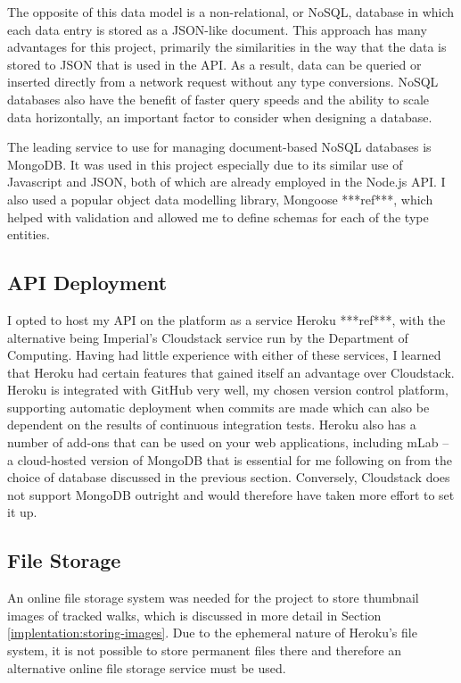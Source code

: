 The opposite of this data model is a non-relational, or NoSQL, database in which each data entry is stored as a JSON-like document. This approach has many advantages for this project, primarily the similarities in the way that the data is stored to JSON that is used in the API. As a result, data can be queried or inserted directly from a network request without any type conversions. NoSQL databases also have the benefit of faster query speeds and the ability to scale data horizontally, an important factor to consider when designing a database.

The leading service to use for managing document-based NoSQL databases is MongoDB. It was used in this project especially due to its similar use of Javascript and JSON, both of which are already employed in the Node.js API. I also used a popular object data modelling library, Mongoose ***ref***, which helped with validation and allowed me to define schemas for each of the type entities.

\subsection{API Deployment}

I opted to host my API on the platform as a service Heroku ***ref***, with the alternative being Imperial's Cloudstack service run by the Department of Computing. Having had little experience with either of these services, I learned that Heroku had certain features that gained itself an advantage over Cloudstack. Heroku is integrated with GitHub very well, my chosen version control platform, supporting automatic deployment when commits are made which can also be dependent on the results of continuous integration tests. Heroku also has a number of add-ons that can be used on your web applications, including mLab -- a cloud-hosted version of MongoDB that is essential for me following on from the choice of database discussed in the previous section. Conversely, Cloudstack does not support MongoDB outright and would therefore have taken more effort to set it up.

\subsection{File Storage}

An online file storage system was needed for the project to store thumbnail images of tracked walks, which is discussed in more detail in Section \ref{implentation:storing-images}. Due to the ephemeral nature of Heroku's file system, it is not possible to store permanent files there and therefore an alternative online file storage service must be used.

